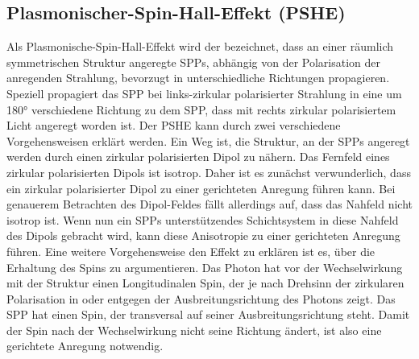 \documentclass[titlepage]{article}
\begin{document}
	\subsection{Plasmonischer-Spin-Hall-Effekt (PSHE)}
	Als Plasmonische-Spin-Hall-Effekt wird der bezeichnet, dass an einer räumlich symmetrischen Struktur angeregte SPPs, abhängig von der Polarisation der anregenden Strahlung, bevorzugt in unterschiedliche Richtungen propagieren. Speziell propagiert das SPP bei links-zirkular polarisierter Strahlung in eine um 180° verschiedene Richtung zu dem SPP, dass mit rechts zirkular polarisiertem Licht angeregt worden ist. Der PSHE kann durch zwei verschiedene Vorgehensweisen erklärt werden. Ein Weg ist, die Struktur, an der SPPs angeregt werden durch einen zirkular polarisierten Dipol zu nähern. Das Fernfeld eines zirkular polarisierten Dipols ist isotrop. Daher ist es zunächst verwunderlich, dass ein zirkular polarisierter Dipol zu einer gerichteten Anregung führen kann. Bei genauerem Betrachten des Dipol-Feldes fällt allerdings auf, dass das Nahfeld nicht isotrop ist. Wenn nun ein SPPs unterstützendes Schichtsystem in diese Nahfeld des Dipols gebracht wird, kann diese Anisotropie zu einer gerichteten Anregung führen.
	Eine weitere Vorgehensweise den Effekt zu erklären ist es, über die Erhaltung des Spins zu argumentieren. Das Photon hat vor der Wechselwirkung mit der Struktur einen Longitudinalen Spin, der je nach Drehsinn der zirkularen Polarisation in oder entgegen der Ausbreitungsrichtung des Photons zeigt. Das SPP hat einen Spin, der transversal auf seiner Ausbreitungsrichtung steht. Damit der Spin nach der Wechselwirkung nicht seine Richtung ändert, ist also eine gerichtete Anregung notwendig.
\end{document}
